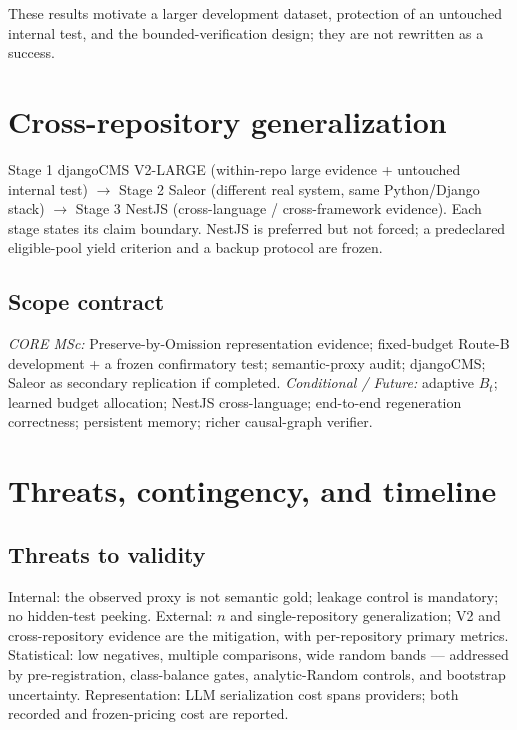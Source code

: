 \documentclass[11pt,a4paper]{article}
\begin{document}
These results motivate a larger development dataset, protection of an untouched
internal test, and the bounded-verification design; they are not rewritten as a
success.

\section{Cross-repository generalization}
\label{sec:gen}

Stage 1 djangoCMS V2-LARGE (within-repo large evidence + untouched internal
test) $\to$ Stage 2 Saleor (different real system, same Python/Django stack)
$\to$ Stage 3 NestJS (cross-language / cross-framework evidence). Each stage
states its claim boundary. NestJS is preferred but not forced; a predeclared
eligible-pool yield criterion and a backup protocol are frozen.

\subsection{Scope contract}
\emph{CORE MSc:} Preserve-by-Omission representation evidence; fixed-budget
Route-B development + a frozen confirmatory test; semantic-proxy audit;
djangoCMS; Saleor as secondary replication if completed.
\emph{Conditional / Future:} adaptive $B_t$; learned budget allocation; NestJS
cross-language; end-to-end regeneration correctness; persistent memory; richer
causal-graph verifier.

\section{Threats, contingency, and timeline}
\label{sec:threats}

\subsection{Threats to validity}
Internal: the observed proxy is not semantic gold; leakage control is mandatory;
no hidden-test peeking. External: $n$ and single-repository generalization; V2
and cross-repository evidence are the mitigation, with per-repository primary
metrics. Statistical: low negatives, multiple comparisons, wide random bands ---
addressed by pre-registration, class-balance gates, analytic-Random controls,
and bootstrap uncertainty. Representation: LLM serialization cost spans
providers; both recorded and frozen-pricing cost are reported.
\end{document}
